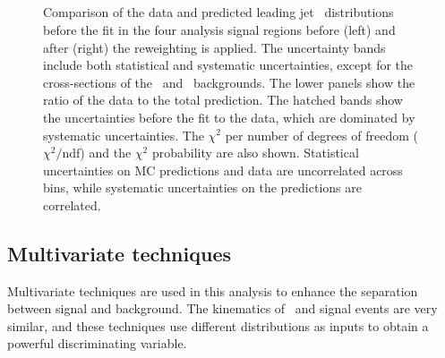 \begin{figure}[htb]
    \RawFloats
    \begin{center}
     \\
       \\
      \\ 
      \\  
    \caption{Comparison of the data and predicted leading jet \pT\ distributions before the fit in the four analysis signal regions before (left) and after (right) the reweighting is applied. The uncertainty bands include both statistical and systematic uncertainties, except for the cross-sections of the \ttb\ and \ttc\ backgrounds.
    The lower panels show the ratio of the data to the total prediction. 
    The hatched bands show the uncertainties before the fit to the data, which are dominated by systematic uncertainties. The $\chi^2$ per number of degrees of freedom ($\chi^2/\mathrm{ndf}$) and the $\chi^2$ probability are also shown. Statistical uncertainties on MC predictions and data are uncorrelated across bins, while systematic uncertainties on the predictions are correlated.}
    \label{Hplustb:RWeffect}
\end{center}
\end{figure}
\clearpage
\subsection{Multivariate techniques}

Multivariate techniques are used in this analysis to enhance the separation between signal and background. The kinematics of \ttb\ and signal events are very similar, and these techniques use different distributions as inputs to obtain a powerful discriminating variable.\\

